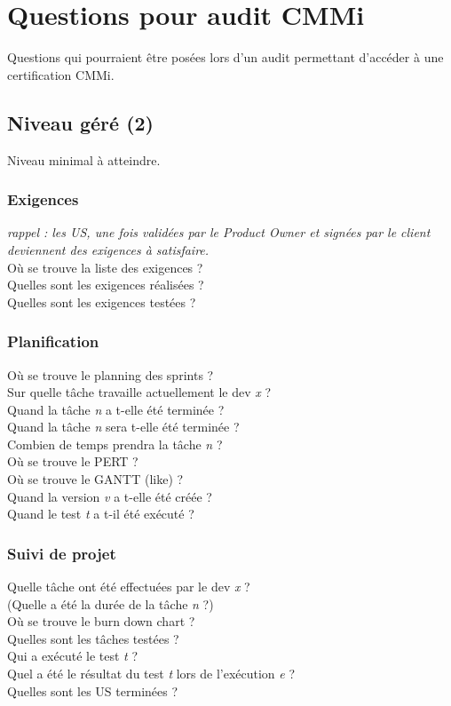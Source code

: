 \chapter{Questions pour audit CMMi}
Questions qui pourraient \^etre pos\'ees lors d'un audit permettant d'acc\'eder \`a une certification CMMi.
\section{Niveau g\'er\'e (2)}
Niveau minimal \`a atteindre.
\subsection{Exigences}
\noindent \textit{rappel : les US, une fois valid\'ees par le Product Owner et sign\'ees par le client deviennent des exigences \`a satisfaire.}\\
O\`u se trouve la liste des exigences ?\\
Quelles sont les exigences r\'ealis\'ees ?\\
Quelles sont les exigences test\'ees ?
\subsection{Planification}
\noindent O\`u se trouve le planning des sprints ?\\
Sur quelle t\^ache travaille actuellement le dev \textit{x} ?\\
Quand la t\^ache \textit{n} a t-elle \'et\'e termin\'ee ?\\
Quand la t\^ache \textit{n} sera t-elle \'et\'e termin\'ee ?\\
Combien de temps prendra la t\^ache \textit{n} ?\\
O\`u se trouve le PERT ?\\
O\`u se trouve le GANTT (like) ?\\
Quand la version \textit{v} a t-elle \'et\'e cr\'e\'ee ?\\
Quand le test \textit{t} a t-il \'et\'e ex\'ecut\'e ?\\
\subsection{Suivi de projet}
\noindent Quelle t\^ache ont \'et\'e effectu\'ees par le dev \textit{x} ?\\
(Quelle a \'et\'e la dur\'ee de la t\^ache \textit{n} ?)\\
O\`u se trouve le burn down chart ?\\
Quelles sont les t\^aches test\'ees ?\\
Qui a ex\'ecut\'e le test \textit{t} ?\\
Quel a \'et\'e le r\'esultat du test \textit{t} lors de l'ex\'ecution \textit{e} ?\\
Quelles sont les US termin\'ees ?
